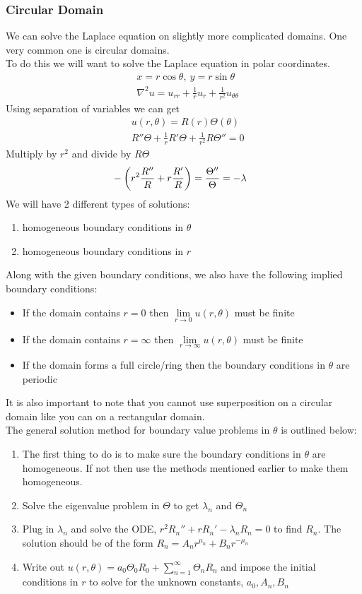 \documentclass[11pt, fleqn]{article}
\begin{document}
\subsubsection{Circular Domain}
We can solve the Laplace equation on slightly more complicated domains. One very common one is circular domains.\\
To do this we will want to solve the Laplace equation in polar coordinates.
\begin{align*}
    &x=r\cos\theta,\ y=r\sin\theta\\
    &\nabla^2 u=u_{rr}+\frac{1}{r}u_r+\frac{1}{r^2}u_{\theta\theta}
\end{align*}
Using separation of variables we can get
\begin{align*}
    &u(r,\theta)=R(r)\Theta(\theta)\\
    &R''\Theta+\frac{1}{r}R'\Theta+\frac{1}{r^2}R\Theta''=0
\end{align*}
Multiply by $r^2$ and divide by $R\Theta$
\begin{align*}
    &-\left( r^2\frac{R''}{R}+r\frac{R'}{R} \right)=\frac{\Theta''}{\Theta}=-\lambda
\end{align*}
We will have 2 different types of solutions:
\begin{enumerate}
    \item homogeneous boundary conditions in $\theta$
    \item homogeneous boundary conditions in $r$
\end{enumerate}
Along with the given boundary conditions, we also have the following implied boundary conditions:
\begin{itemize}
    \item If the domain contains $r=0$ then $\lim\limits_{r\to0}u(r,\theta)$ must be finite
    \item If the domain contains $r=\infty$ then $\lim\limits_{r\to\infty}u(r,\theta)$ must be finite
    \item If the domain forms a full circle/ring then the boundary conditions in $\theta$ are periodic
\end{itemize}
It is also important to note that you cannot use superposition on a circular domain like you can on a rectangular domain.\\
The general solution method for boundary value problems in $\theta$ is outlined below:
\begin{enumerate}
    \item The first thing to do is to make sure the boundary conditions in $\theta$ are homogeneous. If not then use the methods mentioned earlier to make them homogeneous.
    \item Solve the eigenvalue problem in $\Theta$ to get $\lambda_n$ and $\Theta_n$
    \item Plug in $\lambda_n$ and solve the ODE, $r^2R_n''+rR_n'-\lambda_n R_n=0$ to find $R_n$. The solution should be of the form ${R_n=A_nr^{\mu_n}+B_nr^{-\mu_n}}$
    \item Write out $u(r,\theta)=a_0\Theta_0R_0+\sum\limits_{n=1}^\infty\Theta_nR_n$ and impose the initial conditions in $r$ to solve for the unknown constants, $a_0,A_n,B_n$
\end{enumerate}
\end{document}
